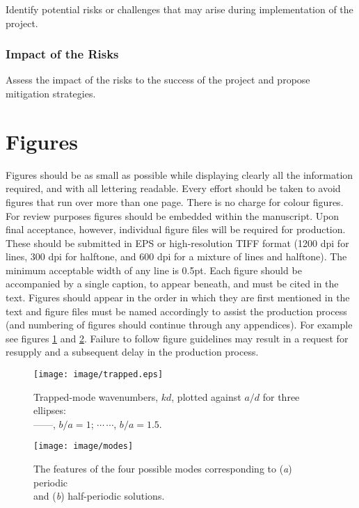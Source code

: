 \documentclass[12pt, a4paper]{article}
\begin{document}
Identify potential risks or challenges that may arise during implementation of the
project.

\subsubsection{Impact of the Risks}

Assess the impact of the risks to the success of the project and propose
mitigation strategies.

\section{Figures}
Figures should be as small as possible while displaying clearly all the information required, and with all lettering readable. Every effort should be taken to avoid figures that run over more than one page. There is no charge for colour figures. For review purposes figures should be embedded within the manuscript. Upon final acceptance, however, individual figure files will be required for production. These should be submitted in EPS or high-resolution TIFF format (1200 dpi for lines, 300 dpi for halftone, and 600 dpi for a mixture of lines and halftone). The minimum acceptable width of any line is 0.5pt. Each figure should be accompanied by a single caption, to appear beneath, and must be cited in the text. Figures should appear in the order in which they are first mentioned in the text and figure files must be named accordingly to assist the production process (and numbering of figures should continue through any appendices). For example see figures \ref{fig:ka} and \ref{fig:kd}. Failure to follow figure guidelines may result in a request for resupply and a subsequent delay in the production process.

\begin{figure}[htbp]
  \centering
  \texttt{[image: image/trapped.eps]}%
  \caption{Trapped-mode wavenumbers, $kd$, plotted against $a/d$ for
    three ellipses:\protect\\%
    ---$\!$---,
    $b/a=1$; $\cdots$\,$\cdots$, $b/a=1.5$.}
\label{fig:ka}
\end{figure}

\begin{figure}
  \centering
  \texttt{[image: image/modes]}
  \caption{The features of the four possible modes corresponding to
  (\textit{a}) periodic\protect\\ and (\textit{b}) half-periodic solutions.}
\label{fig:kd}
\end{figure}
\end{document}
